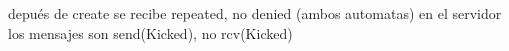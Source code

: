 depués de create se recibe repeated, no denied (ambos automatas)
en el servidor los mensajes son send(Kicked), no rcv(Kicked)

